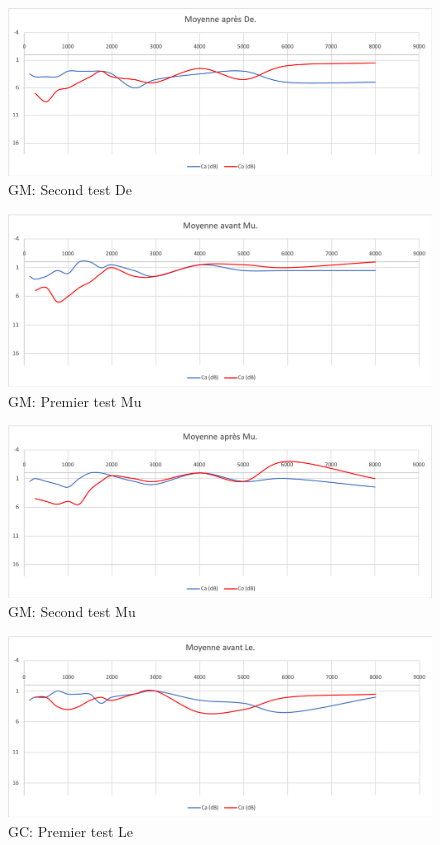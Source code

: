 \begin{figure}[th]
	\centering
	\includegraphics[width=0.7\linewidth]{images/graphiques/moyaprDE}
	\caption[GM: Patient De : 2° test]{GM: Second test De}
	\label{fig:moyaprde}
\end{figure}




\begin{figure}[th]
	\centering
	\includegraphics[width=0.7\linewidth]{images/graphiques/moyavMU.png}
	\caption[GM: Patient Mu : 1° test]{GM: Premier test Mu}
	\label{fig:moyavmu}
\end{figure}


\begin{figure}[th]
	\centering
	\includegraphics[width=0.7\linewidth]{images/graphiques/moyaprMU}
	\caption[GM: Patient Mu : 2° test]{GM: Second test Mu}
	\label{fig:moyaprmu}
\end{figure}



\begin{figure}[th]
	\centering
	\includegraphics[width=0.7\linewidth]{images/graphiques/moyavLE.png}
	\caption[GC: Patient Le : 1° test]{GC: Premier test Le}
	\label{fig:moyavle}
\end{figure}




